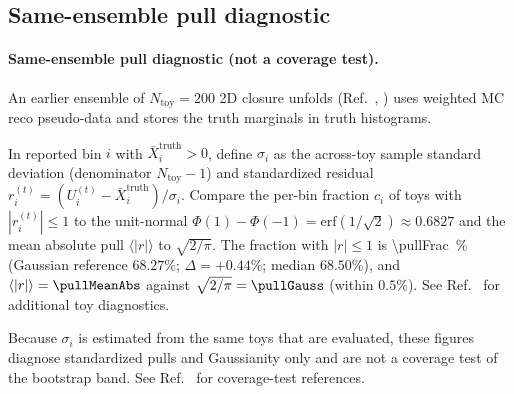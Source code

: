 \subsection{Same-ensemble pull diagnostic}
\label{sec:pull-diagnostic}
\paragraph{Same-ensemble pull diagnostic (not a coverage test).} An earlier ensemble of $N_{\text{toy}}=200$ 2D closure unfolds (Ref.~\cite{NoteRecords2026}, ) uses weighted MC reco pseudo-data and stores the truth marginals in truth histograms.

In reported bin $i$ with $\bar X^{\text{truth}}_{i}>0$, define $\sigma_{i}$ as the across-toy sample standard deviation (denominator $N_{\text{toy}}-1$) and standardized residual $r^{(t)}_{i}=(U^{(t)}_{i}-\bar X^{\text{truth}}_{i})/\sigma_{i}$. Compare the per-bin fraction $c_{i}$ of toys with $|r^{(t)}_{i}|\le1$ to the unit-normal $\Phi(1)-\Phi(-1)=\mathrm{erf}(1/\sqrt 2)\approx0.6827$ and the mean absolute pull $\langle|r|\rangle$ to $\sqrt{2/\pi}$. The fraction with $|r|\le1$ is \SI{\pullFrac}{\percent} (Gaussian reference $68.27\%$; $\Delta = +0.44\%$; median $68.50\%$), and $\langle|r|\rangle=\pullMeanAbs$ against $\sqrt{2/\pi}=\pullGauss$ (within $0.5\%$). See Ref.~\cite{NoteRecords2026} for additional toy diagnostics.

Because $\sigma_i$ is estimated from the same toys that are evaluated, these figures diagnose standardized pulls and Gaussianity only and are not a coverage test of the bootstrap band. See Ref.~\cite{NoteRecords2026} for coverage-test references.
